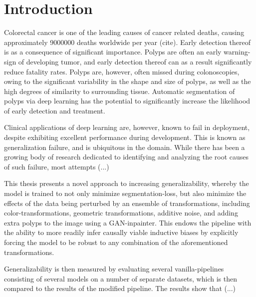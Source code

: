     \chapter*{Introduction}
    \setcounter{chapter}{1}
    Colorectal cancer is one of the leading causes of cancer related deaths, causing approximately 9000000 deaths worldwide per year (cite). Early detection thereof is as a consequence of significant importance. Polyps are often an early warning-sign of developing tumor, and early detection thereof can as a result significantly reduce fatality rates. Polyps are, however, often missed during colonoscopies, owing to the significant variability in the shape and size of polyps, as well as the high degrees of similarity to surrounding tissue. Automatic segmentation of polyps via deep learning has the potential to significantly increase the likelihood of early detection and treatment. 
    
    Clinical applications of deep learning are, however, known to fail in deployment, despite exhibiting excellent performance during development. This is known as generalization failure, and is ubiquitous in the domain. While there has been a growing body of research dedicated to identifying and analyzing the root causes of such failure, most attempts (...)
    
    This thesis presents a novel approach to increasing generalizability, whereby the model is trained to not only minimize segmentation-loss, but also minimize the effects of the data being perturbed by an ensemble of transformations, including color-transformations, geometric transformations, additive noise, and adding extra polyps to the image using a GAN-inpainter. This endows the pipeline with the ability to more readily infer causally viable inductive biases by explicitly forcing the model to be robust to any combination of the aforementioned transformations. 
    
    Generalizability is then measured by evaluating several vanilla-pipelines consisting of several models on a number of separate datasets, which is then compared to the results of the modified pipeline. The results show that (...)
    
   

